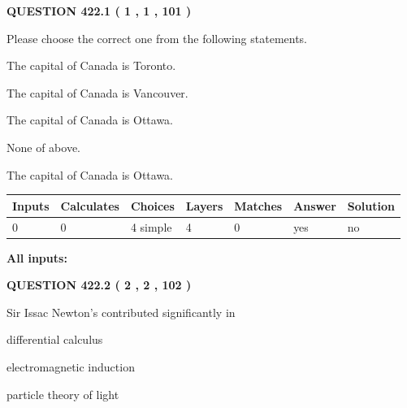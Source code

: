 \documentclass[12pt]{article}
\begin{document}
{\textbf{\Large{QUESTION
422.1 
 ( 1 , 1 , 101 )
}}}
  
  
Please choose the correct one from the following statements.
 
 
The capital of Canada is Toronto.
 
 
The capital of Canada is Vancouver.
 
 
The capital of Canada is Ottawa.
 
 
 None of above.
 
 
\noindent{}
 
 
The capital of Canada is Ottawa.
 
 
\noindent{}
 
 
   
   
   
   
\noindent\begin{tabular}{|l|l|l|l|l|l|l|}
 \hline
Inputs & Calculates & Choices & Layers & Matches & Answer & Solution \\ \hline
 0  & 
 0  & 
 4
  simple  
  & 
 4  & 
 0  & 
  yes & 
  no 
  \\ \hline
 \end{tabular}
   
   
   
   
\noindent{}
   
   
   
   
\noindent\vspace{0.1in}\hspace{-0.08in} {\textbf{\Large{All inputs: }}}
   
   
  
\vspace{0.2in}
  
{\textbf{\Large{QUESTION
422.2 
 ( 2 , 2 , 102 )
}}}
  
  
Sir Issac Newton's contributed significantly in
 
 
differential calculus
 
 
electromagnetic induction
 
 
particle theory of light
 
\end{document}

